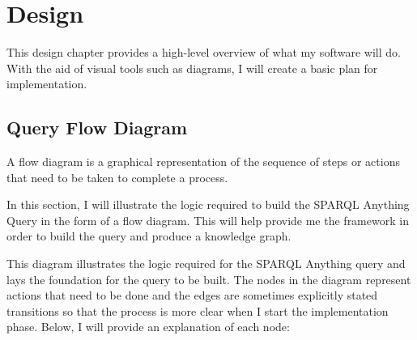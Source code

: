 \chapter{Design}
This design chapter provides a high-level overview of what my software will do. With the aid of visual tools such as diagrams, I will create a basic plan for implementation. 

\section{Query Flow Diagram}
\hspace{0.5cm} A flow diagram is a graphical representation of the sequence of steps or actions that need to be taken to complete a process. \cite{flowchart}

In this section, I will illustrate the logic required to build the SPARQL Anything Query in the form of a flow diagram. This will help provide me the framework in order to build the query and produce a knowledge graph.

\bigskip
\begin{center}
\end{center}

This diagram illustrates the logic required for the SPARQL Anything query and lays the foundation for the query to be built. The nodes in the diagram represent actions that need to be done and the edges are sometimes explicitly stated transitions so that the process is more clear when I start the implementation phase. Below, I will provide an explanation of each node: 

